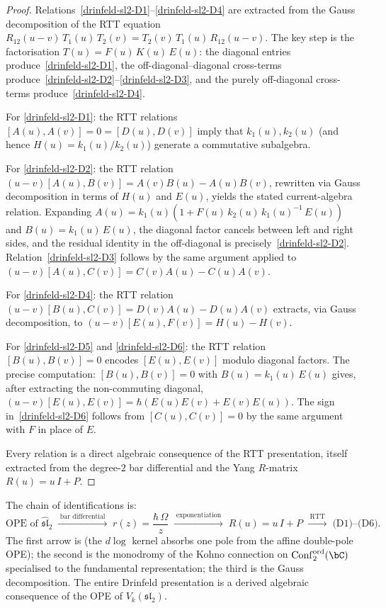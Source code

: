 \begin{proof}
Relations~\ref{drinfeld-sl2-D1}--\ref{drinfeld-sl2-D4} are extracted from the Gauss
decomposition of the RTT equation
$R_{12}(u{-}v)\,T_1(u)\,T_2(v) = T_2(v)\,T_1(u)\,R_{12}(u{-}v)$.
The key step is the factorisation $T(u) = F(u)\,K(u)\,E(u)$: the
diagonal entries produce~\ref{drinfeld-sl2-D1}, the off-diagonal--diagonal
cross-terms produce~\ref{drinfeld-sl2-D2}--\ref{drinfeld-sl2-D3}, and the purely off-diagonal
cross-terms produce~\ref{drinfeld-sl2-D4}.

For \ref{drinfeld-sl2-D1}: the RTT relations $[A(u),A(v)] = 0 = [D(u),D(v)]$
imply that $k_1(u),k_2(u)$ (and hence $H(u) = k_1(u)/k_2(u)$)
generate a commutative subalgebra.

For \ref{drinfeld-sl2-D2}: the RTT relation
$(u{-}v)[A(u),B(v)] = A(v)B(u) - A(u)B(v)$, rewritten via Gauss
decomposition in terms of $H(u)$ and $E(u)$, yields the stated
current-algebra relation. Expanding
$A(u) = k_1(u)(1 + F(u)\,k_2(u)\,k_1(u)^{-1}\,E(u))$ and
$B(u) = k_1(u)\,E(u)$,
the diagonal factor cancels between left and right sides, and the
residual identity in the off-diagonal is precisely~\ref{drinfeld-sl2-D2}.
Relation~\ref{drinfeld-sl2-D3} follows by the same argument applied to
$(u{-}v)[A(u),C(v)] = C(v)A(u) - C(u)A(v)$.

For \ref{drinfeld-sl2-D4}: the RTT relation
$(u{-}v)[B(u),C(v)] = D(v)A(u) - D(u)A(v)$
extracts, via Gauss decomposition, to
$(u{-}v)[E(u),F(v)] = H(u) - H(v)$.

For \ref{drinfeld-sl2-D5} and \ref{drinfeld-sl2-D6}: the RTT relation $[B(u),B(v)] = 0$
encodes $[E(u),E(v)]$ modulo diagonal factors. The
precise computation: $[B(u),B(v)] = 0$ with $B(u) = k_1(u)\,E(u)$
gives, after extracting the non-commuting diagonal,
$(u{-}v)[E(u),E(v)] = \hbar(E(u)E(v) + E(v)E(u))$.
The sign in~\ref{drinfeld-sl2-D6} follows from $[C(u),C(v)] = 0$ by the same
argument with $F$ in place of $E$.

Every relation is a direct algebraic consequence of the RTT
presentation, itself extracted from the degree-$2$ bar differential
and the Yang $R$-matrix $R(u) = u\,I + P$.
\end{proof}

\begin{remark}
\label{rem:drinfeld-bar-provenance}
The chain of identifications is:
\[
\text{OPE of } \widehat{\mathfrak{sl}}_2
\;\xrightarrow{\;\text{bar differential}\;}\;
r(z) = \frac{\hbar\,\Omega}{z}
\;\xrightarrow{\;\text{exponentiation}\;}\;
R(u) = u\,I + P
\;\xrightarrow{\;\text{RTT}\;}\;
\text{(D1)--(D6)}.
\]
The first arrow is (the $d\log$ kernel absorbs one pole from the
affine double-pole OPE); the second is the monodromy of the Kohno
connection on $\mathrm{Conf}_2^{\mathrm{ord}}(\bC)$ specialised to the
fundamental representation; the third is the Gauss decomposition. The
entire Drinfeld presentation is a derived algebraic consequence of the
OPE of $V_k(\mathfrak{sl}_2)$.
\end{remark}

